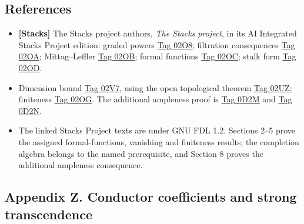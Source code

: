 \documentclass[11pt]{article}
\providecommand{\tightlist}{\setlength{\itemsep}{0pt}\setlength{\parskip}{0pt}}
\begin{document}
\subsection{References}\label{references-2}

\begin{itemize}
\tightlist
\item
  \textbf{{[}Stacks{]}} The Stacks project authors, \emph{The Stacks
  project}, in its AI Integrated Stacks Project edition: graded powers
  \href{https://kokunoyumeto.github.io/stacks-zh-hans-cn/en/coherent.html\#coherent-lemma-cohomology-powers-ideal-times-F}{Tag
  02O8}; filtration consequences
  \href{https://kokunoyumeto.github.io/stacks-zh-hans-cn/en/coherent.html\#coherent-lemma-cohomology-powers-ideal-application}{Tag
  02OA}; Mittag--Leffler
  \href{https://kokunoyumeto.github.io/stacks-zh-hans-cn/en/coherent.html\#coherent-lemma-ML-cohomology-powers-ideal}{Tag
  02OB}; formal functions
  \href{https://kokunoyumeto.github.io/stacks-zh-hans-cn/en/coherent.html\#coherent-theorem-formal-functions}{Tag
  02OC}; stalk form
  \href{https://kokunoyumeto.github.io/stacks-zh-hans-cn/en/coherent.html\#coherent-lemma-formal-functions-stalk}{Tag
  02OD}.
\item
  Dimension bound
  \href{https://kokunoyumeto.github.io/stacks-zh-hans-cn/en/coherent.html\#coherent-lemma-higher-direct-images-zero-above-dimension-fibre}{Tag
  02V7}, using the open topological theorem
  \href{https://kokunoyumeto.github.io/stacks-zh-hans-cn/en/cohomology.html\#cohomology-proposition-vanishing-Noetherian}{Tag
  02UZ}; finiteness
  \href{https://kokunoyumeto.github.io/stacks-zh-hans-cn/en/coherent.html\#coherent-lemma-characterize-finite}{Tag
  02OG}. The additional ampleness proof is
  \href{https://kokunoyumeto.github.io/stacks-zh-hans-cn/en/coherent.html\#coherent-lemma-ample-on-fibre}{Tag
  0D2M} and
  \href{https://kokunoyumeto.github.io/stacks-zh-hans-cn/en/coherent.html\#coherent-lemma-ample-in-neighbourhood}{Tag
  0D2N}.
\item
  The linked Stacks Project texts are under GNU FDL 1.2. Sections 2--5
  prove the assigned formal-functions, vanishing and finiteness results;
  the completion algebra belongs to the named prerequisite, and Section
  8 proves the additional ampleness consequence.
\end{itemize}

\subsection{Appendix Z. Conductor coefficients and strong
transcendence}\label{appendix-z.-conductor-coefficients-and-strong-transcendence}
\end{document}

